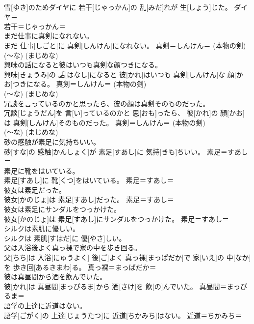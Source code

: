 \documentclass[8pt]{extreport}
\begin{document}
\begin{CJK}{UTF8}{min}
{\\	雪[ゆき]のためダイヤに 若干[じゃっかん]の 乱[みだ]れが 生[しょう]じた。	ダイヤ＝ 
\\	若干＝じゃっかん＝ 
\\	まだ仕事に真剣になれない。	
\\	まだ 仕事[しごと]に 真剣[しんけん]になれない。	真剣＝しんけん＝ (本物の剣) 
\\	(〜な) (まじめな) 
\\	興味の話になると彼はいつも真剣な顔つきになる。	
\\	興味[きょうみ]の 話[はなし]になると 彼[かれ]はいつも 真剣[しんけん]な 顔[かお]つきになる。	真剣＝しんけん＝ (本物の剣) 
\\	(〜な) (まじめな) 
\\	冗談を言っているのかと思ったら、彼の顔は真剣そのものだった。	
\\	冗談[じょうだん]を 言[い]っているのかと 思[おも]ったら、 彼[かれ]の 顔[かお]は 真剣[しんけん]そのものだった。	真剣＝しんけん＝ (本物の剣) 
\\	(〜な) (まじめな) 
\\	砂の感触が素足に気持ちいい。	
\\	砂[すな]の 感触[かんしょく]が 素足[すあし]に 気持[きも]ちいい。	素足＝すあし＝ 
\\	素足に靴をはいている。	
\\	素足[すあし]に 靴[くつ]をはいている。	素足＝すあし＝ 
\\	彼女は素足だった。	
\\	彼女[かのじょ]は 素足[すあし]だった。	素足＝すあし＝ 
\\	彼女は素足にサンダルをつっかけた。	
\\	彼女[かのじょ]は 素足[すあし]にサンダルをつっかけた。	素足＝すあし＝ 
\\	シルクは素肌に優しい。	
\\	シルクは 素肌[すはだ]に 優[やさ]しい。	
\\	父は入浴後よく真っ裸で家の中を歩き回る。	
\\	父[ちち]は 入浴[にゅうよく] 後[ご]よく 真っ裸[まっぱだか]で 家[いえ]の 中[なか]を 歩き回[あるきまわ]る。	真っ裸＝まっぱだか＝ 
\\	彼は真昼間から酒を飲んでいた。	
\\	彼[かれ]は 真昼間[まっぴるま]から 酒[さけ]を 飲[の]んでいた。	真昼間＝まっぴるま＝ 
\\	語学の上達に近道はない。	
\\	語学[ごがく]の 上達[じょうたつ]に 近道[ちかみち]はない。	近道＝ちかみち＝ 
}
\end{CJK}
\end{document}
